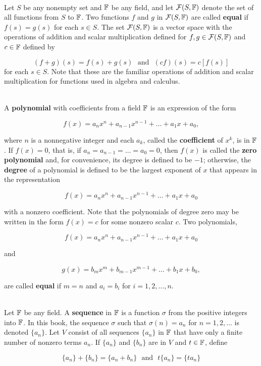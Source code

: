 \begin{definition}\label{Definition 1.7}
	\hfill\\
	Let $S$ be any nonempty set and $\mathbb{F}$ be any field, and let $\mathcal{F}(S, \mathbb{F})$ denote the set of all functions from $S$ to $\mathbb{F}$. Two functions $f$ and $g$ in $\mathcal{F}(S, \mathbb{F})$ are called \textbf{equal} if $f(s) = g(s)$ for each $s \in S$. The set $\mathcal{F}(S, \mathbb{F})$ is a vector space with the operations of addition and scalar multiplication defined for $f,g \in \mathcal{F}(S, \mathbb{F})$ and $c \in \mathbb{F}$ defined by
	
	\[(f + g)(s) = f(s) + g(s)\ \ \ \text{and}\ \ \ (cf)(s) = c[f(s)]\]
	for each $s \in S$. Note that these are the familiar operations of addition and scalar multiplication for functions used in algebra and calculus.
\end{definition}

\begin{definition}
	\hfill\\
	A \textbf{polynomial} with coefficients from a field $\mathbb{F}$ is an expression of the form 
	
	\[f(x)=a_nx^n + a_{n-1}x^{n-1}+\dots+a_1x+a_0,\]
	
	where $n$ is a nonnegative integer and each $a_k$, called the \textbf{coefficient} of $x^k$, is in $\mathbb{F}$. If $f(x)=0$, that is, if $a_n = a_{n-1} = \dots = a_0 = 0$, then $f(x)$ is called the \textbf{zero polynomial} and, for convenience, its degree is defined to be $-1$; otherwise, the \textbf{degree} of a polynomial is defined to be the largest exponent of $x$ that appears in the representation
	
	\[f(x)=a_nx^n + a_{n-1}x^{n-1}+\dots+a_1x+a_0\]
	
	with a nonzero coefficient. Note that the polynomials of degree zero may be written in the form $f(x) = c$ for some nonzero scalar $c$. Two polynomials,
	
	\[f(x)=a_nx^n + a_{n-1}x^{n-1}+\dots+a_1x+a_0\]
	
	and
	
	\[g(x)=b_mx^m + b_{m-1}x^{m-1}+\dots+b_1x+b_0,\]
	
	are called \textbf{equal} if $m=n$ and $a_i = b_i$ for $i=1, 2, \dots, n$.
\end{definition}

\begin{definition}
	\hfill\\
	Let $\mathbb{F}$ be any field. A \textbf{sequence} in $\mathbb{F}$ is a function $\sigma$ from the positive integers into $\mathbb{F}$. In this book, the sequence $\sigma$ such that $\sigma(n) = a_n$ for $n=1, 2, \dots$ is denoted $\{a_n\}$. Let $V$ consist of all sequences $\{a_n\}$ in $\mathbb{F}$ that have only a finite number of nonzero terms $a_n$. If $\{a_n\}$ and $\{b_n\}$ are in $V$ and $t \in \mathbb{F}$, define
	
	\[\{a_n\} + \{b_n\} = \{a_n + b_n\}\ \ \ \text{and}\ \ \ t\{a_n\} = \{ta_n\}\]
\end{definition}

